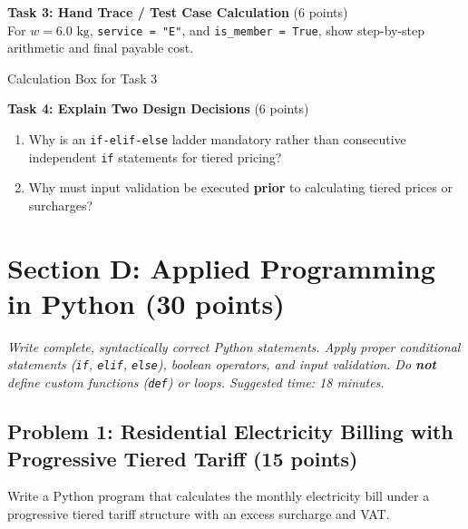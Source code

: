 \documentclass[11pt,a4paper]{article}
\begin{document}
\vspace{0.5mm}
\textbf{Task 3: Hand Trace / Test Case Calculation} (6 points)\\
For $w = 6.0\text{ kg}$, \texttt{service = "E"}, and \texttt{is\_member = True}, show step-by-step arithmetic and final payable cost.

\begin{answerbox}[height=3.5cm]{Calculation Box for Task 3}
\end{answerbox}

\vspace{0.5mm}
\textbf{Task 4: Explain Two Design Decisions} (6 points)
\begin{enumerate}[label=\alph*),leftmargin=2em]
  \item Why is an \texttt{if-elif-else} ladder mandatory rather than consecutive independent \texttt{if} statements for tiered pricing?\\[3.5mm]
  \hrulefill
  \item Why must input validation be executed \textbf{prior} to calculating tiered prices or surcharges?\\[3.5mm]
  \hrulefill
\end{enumerate}

\newpage


\section*{Section D: Applied Programming in Python \hfill \normalsize\normalfont(30 points)}
\textit{Write complete, syntactically correct Python statements. Apply proper conditional statements (\texttt{if}, \texttt{elif}, \texttt{else}), boolean operators, and input validation. Do \textbf{not} define custom functions (\texttt{def}) or loops. Suggested time: 18 minutes.}

\subsection*{Problem 1: Residential Electricity Billing with Progressive Tiered Tariff (15 points)}
Write a Python program that calculates the monthly electricity bill under a progressive tiered tariff structure with an excess surcharge and VAT.
\end{document}
